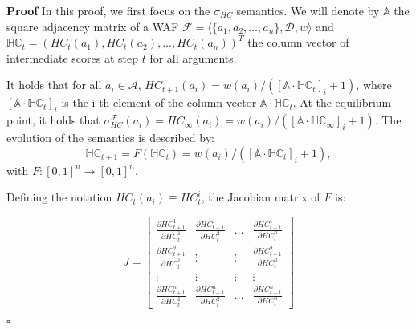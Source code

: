 \documentclass{article}
\newcommand{\AF}{\mathcal{F}}
\newcommand{\A}{\mathcal{A}}
\newcommand{\Adj}{\mathbb{A}}
\newcommand{\HC}{\mathbb{HC}}
\newcommand{\D}{\mathcal{D}}
\newenvironment{proof}{\textbf{Proof}}{\hfill$\square$}
\begin{document}
\begin{proof}
In this proof, we first focus on the $\sigma_{HC}$ semantics. 
%
We will denote by $\Adj$ the square adjacency matrix of a WAF $\AF = \langle \{a_1, a_2, \dots, a_n\}, \D , w \rangle$ and $\HC_t = (HC_t(a_1), HC_t(a_2), \dots, HC_t(a_n) )^{T}$ the column vector of intermediate scores at step $t$ for all arguments.

It holds that for all $a_i \in \A$, ${HC}_{t+1}(a_i) = w(a_i) / ([\Adj \cdot \HC_t]_i + 1)$, where $[\Adj \cdot \HC_t]_i$ is the i-th element of the column vector $\Adj \cdot \HC_t$. At the equilibrium point, it holds that $\sigma_{HC}^\AF(a_i) = {HC}_\infty(a_i) = w(a_i) / ([\Adj \cdot \HC_\infty]_i + 1)$.
%
The evolution of the semantics is described by: $$\HC_{t+1}=F(\HC_{t})=w(a_i) / ([\Adj \cdot \HC_t]_i + 1),$$ 
\noindent
with $F: [0,1]^n \to [0,1]^n$.


Defining the notation $HC_{t}(a_i) \equiv HC^i_{t}$, the Jacobian matrix of $F$ is:

\[
J = \begin{bmatrix}
\frac{\partial HC^1_{t+1}}{\partial HC^1_{t}} & \frac{\partial HC^1_{t+1}}{\partial HC^2_{t}} & \dots  & \frac{\partial HC^1_{t+1}}{\partial HC^n_t} \\

    \frac{\partial HC^2_{t+1}}{\partial HC^1_t} & \vdots & \vdots &  \frac{\partial HC^2_{t+1}}{\partial HC^n_t} \\
    
    \vdots & \vdots & \vdots  & \vdots \\
    
    \frac{\partial HC^n_{t+1}}{\partial HC^1_t} & \frac{\partial HC^n_{t+1}}{\partial HC^2_t}  & \dots  & \frac{\partial HC^n_{t+1}}{\partial HC^n_t}
\end{bmatrix}
\]






\end{proof}
\end{document}
